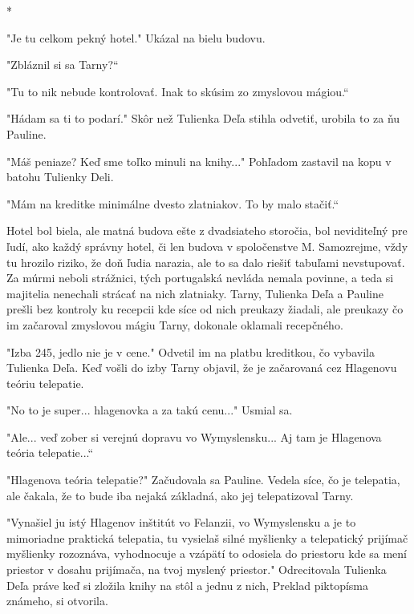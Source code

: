 \documentclass{book}
\begin{document}
\begin{center}

*

\end{center}

"$ $Je tu celkom pekný hotel."$ $ Ukázal na bielu budovu.

"$ $Zbláznil si sa Tarny?“

"$ $Tu to nik nebude kontrolovať. Inak to skúsim zo zmyslovou mágiou.“

"$ $Hádam sa ti to podarí."$ $ Skôr než Tulienka Deľa stihla odvetiť, urobila to za ňu Pauline.

"$ $Máš peniaze? Keď sme toľko minuli na knihy..."$ $ Pohľadom zastavil na kopu v batohu Tulienky Deli.

"$ $Mám na kreditke minimálne dvesto zlatniakov. To by malo stačiť.“

Hotel bol biela, ale matná budova ešte z dvadsiateho storočia, bol neviditeľný pre ľudí, ako každý správny hotel, či len budova v spoločenstve M. Samozrejme, vždy tu hrozilo riziko, že doň ľudia narazia, ale to sa dalo riešiť tabuľami nevstupovať. Za múrmi neboli strážnici, tých portugalská nevláda nemala povinne, a teda si majitelia nenechali strácať na nich zlatniaky. Tarny, Tulienka Deľa a Pauline prešli bez kontroly ku recepcii kde síce od nich preukazy žiadali, ale preukazy čo im začaroval zmyslovou mágiu Tarny, dokonale oklamali recepčného.

"$ $Izba 245, jedlo nie je v cene."$ $ Odvetil im na platbu kreditkou, čo vybavila Tulienka Deľa. Keď vošli do izby Tarny objavil, že je začarovaná cez Hlagenovu teóriu telepatie.

"$ $No to je super... hlagenovka a za takú cenu..."$ $ Usmial sa.

"$ $Ale... veď zober si verejnú dopravu vo Wymyslensku... Aj tam je Hlagenova teória telepatie...“

"$ $Hlagenova teória telepatie?"$ $ Začudovala sa Pauline. Vedela síce, čo je telepatia, ale čakala, že to bude iba nejaká základná, ako jej telepatizoval Tarny.

"$ $Vynašiel ju istý Hlagenov inštitút vo Felanzii, vo Wymyslensku a je to mimoriadne praktická telepatia, tu vysielaš silné myšlienky a telepatický prijímač myšlienky rozoznáva, vyhodnocuje a vzápätí to odosiela do priestoru kde sa mení priestor v dosahu prijímača, na tvoj myslený priestor."$ $ Odrecitovala Tulienka Deľa práve keď si zložila knihy na stôl a jednu z nich, Preklad piktopísma známeho, si otvorila.
\end{document}
